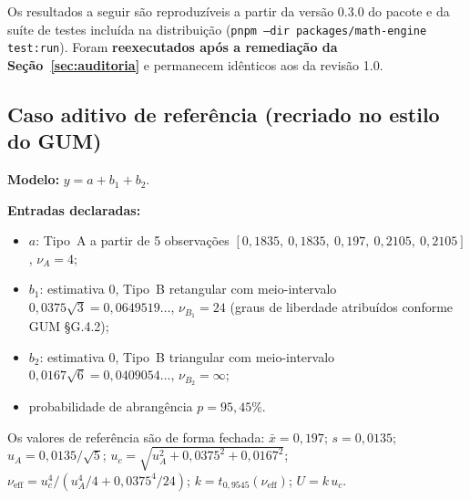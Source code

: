 \documentclass[11pt,a4paper]{article}
\newcommand{\docVersion}{0.3.0}
\begin{document}
Os resultados a seguir são reproduzíveis a partir da versão \docVersion{} do pacote e da suíte de testes incluída na distribuição (\texttt{pnpm --dir packages/math-engine test:run}). Foram \textbf{reexecutados após a remediação da Seção~\ref{sec:auditoria}} e permanecem idênticos aos da revisão 1.0.

\subsection{Caso aditivo de referência (recriado no estilo do GUM)}

\textbf{Modelo:} \(y = a + b_1 + b_2\).

\textbf{Entradas declaradas:}
\begin{itemize}
  \item \(a\): Tipo~A a partir de 5 observações \([0{,}1835,\ 0{,}1835,\ 0{,}197,\ 0{,}2105,\ 0{,}2105]\), \(\nu_A = 4\);
  \item \(b_1\): estimativa 0, Tipo~B retangular com meio-intervalo \(0{,}0375\sqrt{3} = 0{,}0649519\ldots\), \(\nu_{B_1} = 24\) (graus de liberdade atribuídos conforme GUM §G.4.2);
  \item \(b_2\): estimativa 0, Tipo~B triangular com meio-intervalo \(0{,}0167\sqrt{6} = 0{,}0409054\ldots\), \(\nu_{B_2} = \infty\);
  \item probabilidade de abrangência \(p = 95{,}45\%\).
\end{itemize}

Os valores de referência são de forma fechada: \(\bar{x} = 0{,}197\); \(s = 0{,}0135\); \(u_A = 0{,}0135/\sqrt{5}\); \(u_c = \sqrt{u_A^2 + 0{,}0375^2 + 0{,}0167^2}\); \(\nu_{\text{eff}} = u_c^4 / (u_A^4/4 + 0{,}0375^4/24)\); \(k = t_{0{,}9545}(\nu_{\text{eff}})\); \(U = k\,u_c\).
\end{document}

